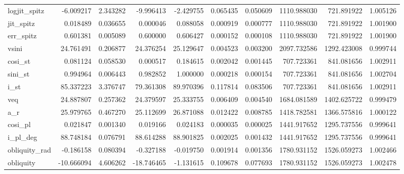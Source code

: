 \begin{tabular}{lrrrrrrrrr}
logjit\_spitz  &   -6.009217 &   2.343282 &   -9.996413 &   -2.429755 &   0.065435 &  0.050609 &  1110.988030 &   721.891922 &  1.005126 \\
jit\_spitz     &    0.018489 &   0.036655 &    0.000046 &    0.088058 &   0.000919 &  0.000777 &  1110.988030 &   721.891922 &  1.001900 \\
err\_spitz     &    0.601381 &   0.005089 &    0.600000 &    0.606427 &   0.000152 &  0.000108 &  1110.988030 &   721.891922 &  1.001900 \\
vsini         &   24.761491 &   0.206877 &   24.376254 &   25.129647 &   0.004523 &  0.003200 &  2097.732586 &  1292.423008 &  0.999744 \\
cosi\_st       &    0.081124 &   0.058530 &    0.000517 &    0.184615 &   0.002042 &  0.001445 &   707.723361 &   841.081656 &  1.002911 \\
sini\_st       &    0.994964 &   0.006443 &    0.982852 &    1.000000 &   0.000218 &  0.000154 &   707.723361 &   841.081656 &  1.002704 \\
i\_st          &   85.337223 &   3.376747 &   79.361308 &   89.970396 &   0.117814 &  0.083506 &   707.723361 &   841.081656 &  1.002911 \\
veq           &   24.887807 &   0.257362 &   24.379597 &   25.333755 &   0.006409 &  0.004540 &  1684.081589 &  1402.625722 &  0.999479 \\
a\_r           &   25.979765 &   0.467270 &   25.112699 &   26.871088 &   0.012422 &  0.008785 &  1418.782581 &  1366.575816 &  1.000122 \\
cosi\_pl       &    0.021847 &   0.001340 &    0.019166 &    0.024183 &   0.000035 &  0.000025 &  1441.917652 &  1295.737556 &  0.999641 \\
i\_pl\_deg      &   88.748184 &   0.076791 &   88.614288 &   88.901825 &   0.002025 &  0.001432 &  1441.917652 &  1295.737556 &  0.999641 \\
obliquity\_rad &   -0.186158 &   0.080394 &   -0.327188 &   -0.019750 &   0.001914 &  0.001356 &  1780.931152 &  1526.059273 &  1.002466 \\
obliquity     &  -10.666094 &   4.606262 &  -18.746465 &   -1.131615 &   0.109678 &  0.077693 &  1780.931152 &  1526.059273 &  1.002478 \\
\bottomrule
\end{tabular}
